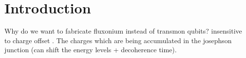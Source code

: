 \chapter{Introduction}

Why do we want to fabricate fluxonium instead of transmon qubits? 
insensitive to charge offset \Cite{Manucharyan2009}. The charges which are being accumulated in the josephson junction (can shift the energy levels + decoherence time).
